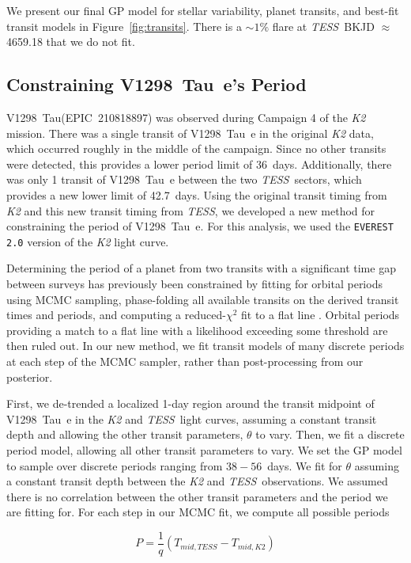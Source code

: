 \documentclass[linenumbers,twocolumn]{aastex631}
\newcommand{\tess}{\textit{TESS}}
\newcommand{\sname}{V1298~Tau\xspace}
\newcommand{\planete}{V1298~Tau~e\xspace}
\begin{document}
We present our final GP model for stellar variability, planet transits, and best-fit transit models in Figure~\ref{fig:transits}. There is a $\sim 1\%$ flare at \tess\ BKJD $\approx$ 4659.18 that we do not fit. 


\subsection{Constraining \planete's Period}

\sname (EPIC~210818897) was observed during Campaign 4 of the \textit{K2} mission. There was a single transit of \planete in the original \textit{K2} data, which occurred roughly in the middle of the campaign. Since no other transits were detected, this provides a lower period limit of 36~days. Additionally, there was only 1 transit of \planete between the two \tess\ sectors, which provides a new lower limit of 42.7~days. Using the original transit timing from \textit{K2} and this new transit timing from \tess, we developed a new method for constraining the period of \planete. For this analysis, we used the \texttt{EVEREST 2.0} \citep{luger18} version of the \textit{K2} light curve. 

Determining the period of a planet from two transits with a significant time gap between surveys has previously been constrained by fitting for orbital periods using MCMC sampling, phase-folding all available transits on the derived transit times and periods, and computing a reduced-$\chi^2$ fit to a flat line \citep{becker19}. Orbital periods providing a match to a flat line with a likelihood exceeding some threshold are then ruled out. In our new method, we fit transit models of many discrete periods at each step of the MCMC sampler, rather than post-processing from our posterior.

First, we de-trended a localized 1-day region around the transit midpoint of \planete in the \textit{K2} and \tess\ light curves, assuming a constant transit depth and allowing the other transit parameters, $\theta$ to vary. Then, we fit a discrete period model, allowing all other transit parameters to vary. We set the GP model to sample over discrete periods ranging from $38 - 56$~days. We fit for $\theta$ assuming a constant transit depth between the \textit{K2} and \tess\ observations. We assumed there is no correlation between the other transit parameters and the period we are fitting for. For each step in our MCMC fit, we compute all possible periods

\begin{equation}\label{eq:period}
    P = \frac{1}{q} \left(T_{mid,TESS} - T_{mid, K2}\right)
\end{equation}
\end{document}
